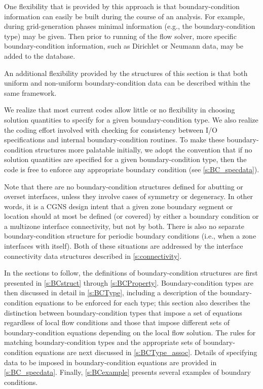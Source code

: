One flexibility that is provided by this approach is that
boundary-condition information can easily be built during the course
of an analysis.  For example, during grid-generation phases minimal
information (e.g., the boundary-condition type) may be given.  Then
prior to running of the flow solver, more specific boundary-condition
information, such as Dirichlet or Neumann data, may be added to the
database.

An additional flexibility provided by the structures of this section
is that both uniform and non-uniform boundary-condition data can be
described within the same framework.

We realize that most current codes allow little or no flexibility in
choosing solution quantities to specify for a given boundary-condition
type.  We also realize the coding effort involved with checking for
consistency between I/O specifications and internal boundary-condition
routines.  To make these boundary-condition structures more
palatable initially, we adopt the convention that if no solution
quantities are specified for a given boundary-condition type, then
the code is free to enforce any appropriate boundary condition (see
\autoref{s:BC_specdata}).

Note that there are no boundary-condition structures defined for
abutting or overset interfaces, unless they involve cases of symmetry or
degeneracy.
In other words, it is a CGNS design intent that a given zone boundary
segment or location should at most be defined (or covered) by either a
boundary condition or a multizone interface connectivity, but not by
both.
There is also no separate boundary-condition structure for periodic
boundary conditions (i.e., when a zone interfaces with itself).
Both of these situations are addressed by the interface connectivity
data structures described in \autoref{s:connectivity}.

In the sections to follow, the definitions of boundary-condition
structures are first presented in \autoref{s:BCstruct} through
\autoref{s:BCProperty}.  Boundary-condition types are then discussed
in detail in \autoref{s:BCType}, including a description of the
boundary-condition equations to be enforced for each type; this section
also describes the distinction between boundary-condition types that
impose a set of equations regardless of local flow conditions and those
that impose different sets of boundary-condition equations depending
on the local flow solution.  The rules for matching boundary-condition
types and the appropriate sets of boundary-condition equations are
next discussed in \autoref{s:BCType_assoc}.  Details of specifying
data to be imposed in boundary-condition equations are provided in
\autoref{s:BC_specdata}.  Finally, \autoref{s:BCexample} presents
several examples of boundary conditions.

